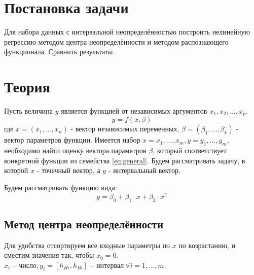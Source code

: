 \documentclass[a4paper,12pt]{article}
\begin{document}
    
    \newpage

    \tableofcontents
    \newpage

    \listoffigures
    \newpage

    \listoftables
    \newpage

    \section{Постановка задачи}
    Для набора данных с интервальной неопределённостью построить нелинейную регрессию методом центра неопределённости и методом распознающего функционала.
    Сравнить результаты.

    \section{Теория}
    Пусть величина $ y $ является функцией от независимых аргументов $ x_{1}, x_{2}, ..., x_{p} $.
    \begin{equation}
        y = f(x, \beta)
        \label{eq:general}
    \end{equation}
    где $ x = (x_1, ..., x_n) $ - вектор независимых переменных, $ \beta = (\beta_{1}, ..., \beta_{k}) $ - вектор параметров функции.
    Имеется набор $ x = {x_{1}, ..., x_{m}}, y = {y_{1}, ..., y_{m}} $, необходимо найти оценку вектора параметров $ \beta $, который соответствует конкретной функции из семейства \ref{eq:general}.
    Будем рассматривать задачу, в которой $ x $ - точечный вектор, а $ y $ - интервальный вектор.
    \newline

    \noindent Будем рассматривать функцию вида:
    \begin{equation}
        y = \beta_{0} + \beta_{1} \cdot x + \beta_{2} \cdot x^{2}
    \end{equation}

    \subsection{Метод центра неопределённости}
    Для удобства отсортируем все входные параметры по $ x $ по возрастанию, и сместим значения так, чтобы $ x_{0} = 0 $.
    $ x_{i} - \text{число}, y_{i} = [h_{Hi}, h_{Bi}] - \text{интервал} \ \forall i = 1, ..., m $.
\end{document}
